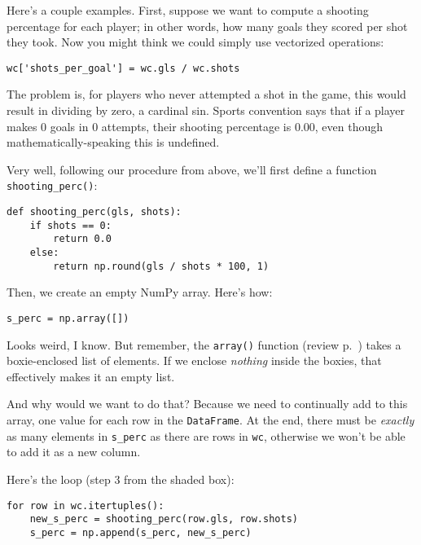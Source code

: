 Here's a couple examples. First, suppose we want to compute a shooting
percentage for each player; in other words, how many goals they scored per shot
they took. Now you might think we could simply use vectorized operations:

\begin{Verbatim}[fontsize=\small,samepage=true,frame=single,framesep=3mm]
wc['shots_per_goal'] = wc.gls / wc.shots
\end{Verbatim}


The problem is, for players who never attempted a shot in the game, this would
result in dividing by zero, a cardinal sin. Sports convention says that if a
player makes 0 goals in 0 attempts, their shooting percentage is 0.00, even
though mathematically-speaking this is undefined.

Very well, following our procedure from above, we'll first define a function
\texttt{shooting\_perc()}:

\begin{Verbatim}[fontsize=\small,samepage=true,frame=single,framesep=3mm]
def shooting_perc(gls, shots):
    if shots == 0:
        return 0.0
    else:
        return np.round(gls / shots * 100, 1)
\end{Verbatim}

Then, we create an empty NumPy array. Here's how:

\begin{Verbatim}[fontsize=\small,samepage=true,frame=single,framesep=3mm]
s_perc = np.array([])
\end{Verbatim}

Looks weird, I know. But remember, the \texttt{array()} function (review
p.~\pageref{arrayFunction}) takes a boxie-enclosed list of elements. If we
enclose \textit{nothing} inside the boxies, that effectively makes it an empty
list.

And why would we want to do that? Because we need to continually add to this
array, one value for each row in the \texttt{DataFrame}. At the end, there must
be \textit{exactly} as many elements in \texttt{s\_perc} as there are rows in
\texttt{wc}, otherwise we won't be able to add it as a new column.

Here's the loop (step 3 from the shaded box):

\begin{Verbatim}[fontsize=\small,samepage=true,frame=single,framesep=3mm]
for row in wc.itertuples():
    new_s_perc = shooting_perc(row.gls, row.shots)
    s_perc = np.append(s_perc, new_s_perc)
\end{Verbatim}

